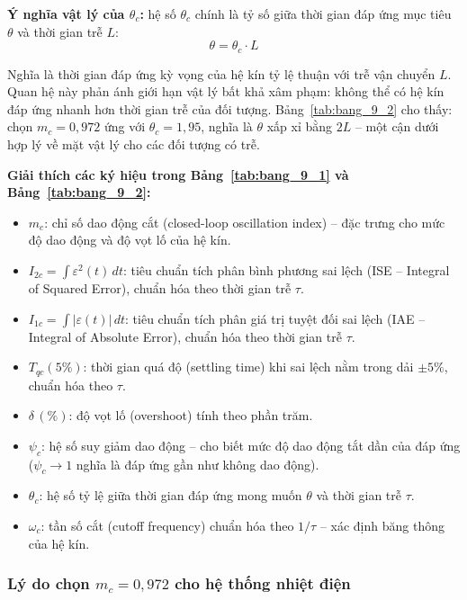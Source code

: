 \documentclass[../main.tex]{subfiles}
\begin{document}
\textbf{Ý nghĩa vật lý của $\theta_c$:} hệ số $\theta_c$ chính là tỷ số giữa thời gian đáp ứng mục tiêu $\theta$ và thời gian trễ $L$:
\begin{equation}
    \theta = \theta_c \cdot L
    \label{eq:theta_definition}
\end{equation}

Nghĩa là thời gian đáp ứng kỳ vọng của hệ kín tỷ lệ thuận với trễ vận chuyển $L$. Quan hệ này phản ánh giới hạn vật lý bất khả xâm phạm: không thể có hệ kín đáp ứng nhanh hơn thời gian trễ của đối tượng. Bảng~\ref{tab:bang_9_2} cho thấy: chọn $m_c = 0{,}972$ ứng với $\theta_c = 1{,}95$, nghĩa là $\theta$ xấp xỉ bằng $2L$ -- một cận dưới hợp lý về mặt vật lý cho các đối tượng có trễ.

\textbf{Giải thích các ký hiệu trong Bảng~\ref{tab:bang_9_1} và Bảng~\ref{tab:bang_9_2}:}
\begin{itemize}
    \item $m_c$: chỉ số dao động cắt (closed-loop oscillation index) -- đặc trưng cho mức độ dao động và độ vọt lố của hệ kín.
    \item $I_{2c} = \displaystyle\int \varepsilon^2(t)\,dt$: tiêu chuẩn tích phân bình phương sai lệch (ISE -- Integral of Squared Error), chuẩn hóa theo thời gian trễ $\tau$.
    \item $I_{1c} = \displaystyle\int |\varepsilon(t)|\,dt$: tiêu chuẩn tích phân giá trị tuyệt đối sai lệch (IAE -- Integral of Absolute Error), chuẩn hóa theo thời gian trễ $\tau$.
    \item $T_{qc}(5\%)$: thời gian quá độ (settling time) khi sai lệch nằm trong dải $\pm 5\%$, chuẩn hóa theo $\tau$.
    \item $\delta\,(\%)$: độ vọt lố (overshoot) tính theo phần trăm.
    \item $\psi_c$: hệ số suy giảm dao động -- cho biết mức độ dao động tắt dần của đáp ứng ($\psi_c \to 1$ nghĩa là đáp ứng gần như không dao động).
    \item $\theta_c$: hệ số tỷ lệ giữa thời gian đáp ứng mong muốn $\theta$ và thời gian trễ $\tau$.
    \item $\omega_c$: tần số cắt (cutoff frequency) chuẩn hóa theo $1/\tau$ -- xác định băng thông của hệ kín.
\end{itemize}

\subsubsection{Lý do chọn $m_c = 0{,}972$ cho hệ thống nhiệt điện}
\end{document}

